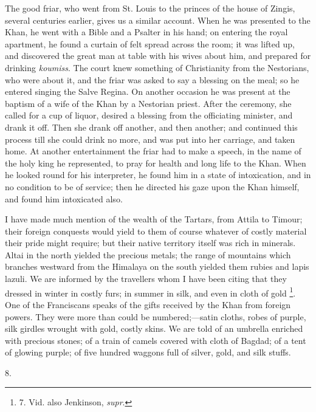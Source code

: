 The good friar, who went from
St. Louis to the princes of the house of Zingis, several centuries
earlier, gives us a similar account. When he was presented to the
Khan, he went with a Bible and a Psalter in his hand; on entering the
royal apartment, he found a curtain of felt spread across the room; it
was lifted up, and discovered the great man at table with his wives
about him, and prepared for drinking \emph{koumiss}. The court knew
something of Christianity from the Nestorians, who were about it, and
the friar was asked to say a blessing on the meal; so he entered
singing the Salve Regina. On another occasion he was present at the
baptism of a wife of the Khan by a Nestorian priest. After the
ceremony, she called for a cup of liquor, desired a blessing from the
officiating minister, and drank it off. Then she drank off another,
and then another; and continued this process till she could drink no
more, and was put into her carriage, and taken home. At another
entertainment the friar had to make a speech, in the name of the holy
king he represented, to pray for health and long life to the Khan.
When he looked round for his interpreter, he found him in a state of
intoxication, and in no condition to be of service; then he directed
his gaze upon the Khan himself, and found him intoxicated also.

I have made much mention of
the wealth of the Tartars, from Attila to Timour; their foreign
conquests would yield to them of course whatever of costly material
their pride might require; but their native territory itself was rich
in minerals. Altai in the north yielded the precious metals; the range
of mountains which branches westward from the Himalaya on the south
yielded them rubies and lapis lazuli. We are informed by the
travellers whom I have been citing that they dressed in winter in
costly furs; in summer in silk, and even in cloth of gold \footnote{7.
Vid. also Jenkinson, \emph{supr}.}. One of the Franciscans speaks of the gifts received by the
Khan from foreign powers. They were more than could be
numbered;—satin cloths, robes of purple, silk girdles wrought with
gold, costly skins. We are told of an umbrella enriched with precious
stones; of a train of camels covered with cloth of Bagdad; of a tent
of glowing purple; of five hundred waggons full of silver, gold, and
silk stuffs.

8.

